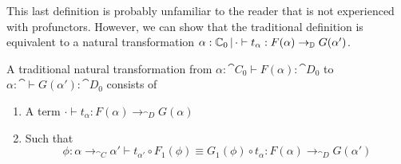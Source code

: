 \documentclass{article}
\begin{document}
This last definition is probably unfamiliar to the reader that is not
experienced with profunctors.
%
However, we can show that the traditional definition is equivalent to
a natural transformation $\alpha : \mathbb C_0 \,|\, \cdot \vdash
t_{\alpha} : F(\alpha) \to_{\mathbb D} G(\alpha')$.

\begin{definition}
  A traditional natural transformation from $\alpha : \cat C_0 \vdash
  F(\alpha) : \cat D_0$ to $\alpha : \cat \vdash G(\alpha') : \cat
  D_0$ consists of
  \begin{enumerate}
  \item A term $\cdot \vdash t_{\alpha} : F(\alpha) \to_{\cat D} G(\alpha)$
  \item Such that
    \[ \phi : \alpha \to_{\cat C} \alpha' \vdash t_{\alpha'} \circ F_1(\phi) \equiv G_1(\phi) \circ t_{\alpha} : F(\alpha) \to_{\cat D} G(\alpha')
    \]
  \end{enumerate}
\end{definition}
\end{document}
